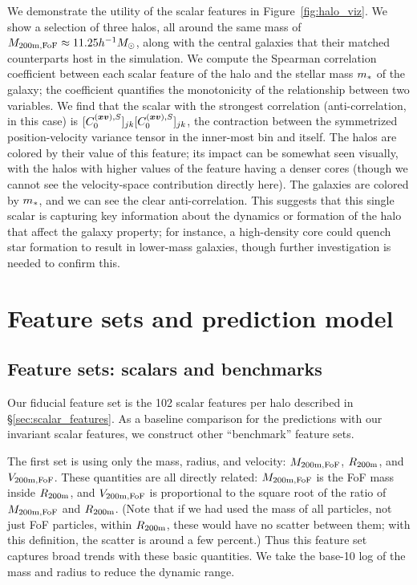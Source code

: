 We demonstrate the utility of the scalar features in Figure~\ref{fig:halo_viz}.
We show a selection of three \dark halos, all around the same mass of $M_\mathrm{200m,FoF} \approx 11.25 h^{-1} M_\mathrm{\odot}$, along with the central galaxies that their matched counterparts host in the \hydro simulation.
We compute the Spearman correlation coefficient between each scalar feature of the halo and the stellar mass $m_*$ of the galaxy; the coefficient quantifies the monotonicity of the relationship between two variables.
We find that the scalar with the strongest correlation (anti-correlation, in this case) is $[C^{(\bm{x}\bm{v}),S}_0]_{jk} [C^{(\bm{x}\bm{v}),S}_0]_{jk}$, the contraction between the symmetrized position-velocity variance tensor in the inner-most bin and itself.
The halos are colored by their value of this feature; its impact can be somewhat seen visually, with the halos with higher values of the feature having a denser cores (though we cannot see the velocity-space contribution directly here).
The galaxies are colored by $m_*$, and we can see the clear anti-correlation.
This suggests that this single scalar is capturing key information about the dynamics or formation of the halo that affect the galaxy property; for instance, a high-density core could quench star formation to result in lower-mass galaxies, though further investigation is needed to confirm this.


\section{Feature sets and prediction model}
\label{sec:features_model}

\subsection{Feature sets: scalars and benchmarks}
\label{sec:features}

Our fiducial feature set is the 102 scalar features per halo described in \S\ref{sec:scalar_features}.
As a baseline comparison for the predictions with our invariant scalar features, we construct other ``benchmark'' feature sets.

The first set is using only the mass, radius, and velocity: $M_\mathrm{200m,FoF}$, $R_\mathrm{200m}$, and $V_\mathrm{200m,FoF}$. 
These quantities are all directly related: $M_\mathrm{200m,FoF}$ is the FoF mass inside $R_\mathrm{200m}$, and $V_\mathrm{200m,FoF}$ is proportional to the square root of the ratio of $M_\mathrm{200m,FoF}$ and $R_\mathrm{200m}$.
(Note that if we had used the mass of all particles, not just FoF particles, within $R_\mathrm{200m}$, these would have no scatter between them; with this definition, the scatter is around a few percent.)
Thus this feature set captures broad trends with these basic quantities.
We take the base-10 log of the mass and radius to reduce the dynamic range.

